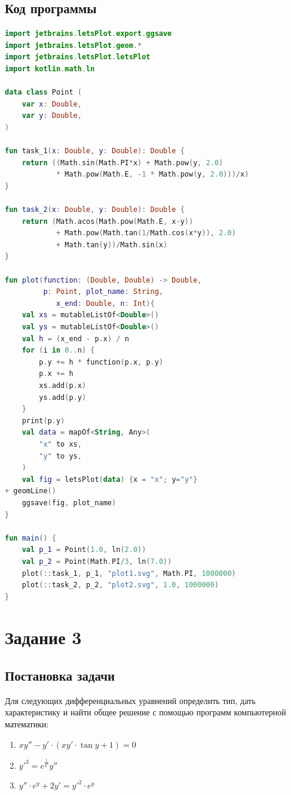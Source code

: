 \documentclass[a4paper, 14pt, fleqn]{extarticle}
\begin{document}
		\subsection{Код программы}
			\begin{lstlisting}[language=Kotlin]
import jetbrains.letsPlot.export.ggsave
import jetbrains.letsPlot.geom.*
import jetbrains.letsPlot.letsPlot
import kotlin.math.ln

data class Point (
    var x: Double,
    var y: Double,
)

fun task_1(x: Double, y: Double): Double {
    return ((Math.sin(Math.PI*x) + Math.pow(y, 2.0)
            * Math.pow(Math.E, -1 * Math.pow(y, 2.0)))/x)
}

fun task_2(x: Double, y: Double): Double {
    return (Math.acos(Math.pow(Math.E, x-y))
            + Math.pow(Math.tan(1/Math.cos(x*y)), 2.0)
            + Math.tan(y))/Math.sin(x)
}

fun plot(function: (Double, Double) -> Double,
         p: Point, plot_name: String,
            x_end: Double, n: Int){
    val xs = mutableListOf<Double>()
    val ys = mutableListOf<Double>()
    val h = (x_end - p.x) / n
    for (i in 0..n) {
        p.y += h * function(p.x, p.y)
        p.x += h
        xs.add(p.x)
        ys.add(p.y)
    }
    print(p.y)
    val data = mapOf<String, Any>(
        "x" to xs,
        "y" to ys,
    )
    val fig = letsPlot(data) {x = "x"; y="y"} 
+ geomLine()
    ggsave(fig, plot_name)
}

fun main() {
    val p_1 = Point(1.0, ln(2.0))
    val p_2 = Point(Math.PI/3, ln(7.0))
    plot(::task_1, p_1, "plot1.svg", Math.PI, 1000000)
    plot(::task_2, p_2, "plot2.svg", 1.0, 1000000)
}
				\end{lstlisting}

	\pagebreak
	\section{Задание 3}
		\subsection{Постановка задачи}
			\noindent Для следующих дифференциальных уравнений определить тип, дать характеристику и найти общее решение с помощью программ компьютерной математики:
		\begin{enumerate}
			\item \( xy'' - y' \cdot (xy' \cdot \tan{y} + 1) = 0\)
			\item \( y'^3 = e^{\frac{1}{y'}}y'' \)
			\item \( y'' \cdot e^y + 2y' = y'^2 \cdot e^y \)
		\end{enumerate}
\end{document}
